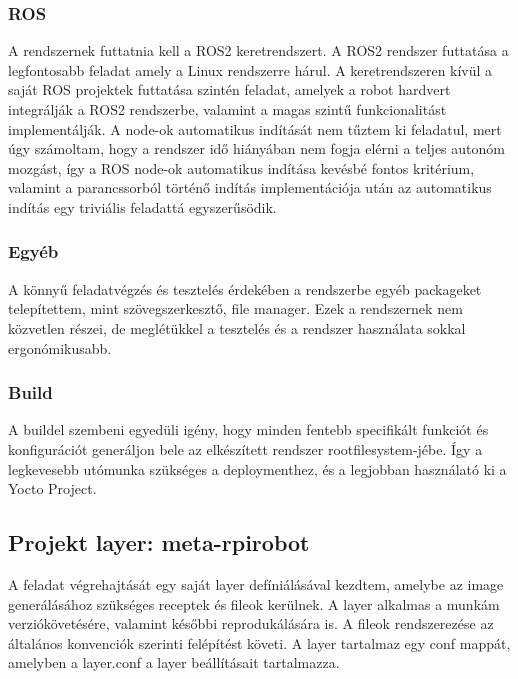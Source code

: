 \subsubsection{ROS}

A rendszernek futtatnia kell a ROS2 keretrendszert. A ROS2 rendszer
futtatása a legfontosabb feladat amely a Linux rendszerre hárul. A
keretrendszeren kívül a saját ROS projektek futtatása szintén feladat, amelyek a
robot hardvert integrálják a ROS2 rendszerbe, valamint a magas szintű
funkcionalitást implementálják. A node-ok automatikus indítását nem tűztem ki
feladatul, mert úgy számoltam, hogy a rendszer idő hiányában nem fogja elérni a
teljes autonóm mozgást, így a ROS node-ok automatikus indítása kevésbé fontos
kritérium, valamint a parancssorból történő indítás implementációja után az
automatikus indítás egy triviális feladattá egyszerűsödik.

\subsubsection{Egyéb}

A könnyű feladatvégzés és tesztelés érdekében a rendszerbe egyéb packageket
telepítettem, mint szövegszerkesztő, file manager. Ezek a rendszernek nem
közvetlen részei, de meglétükkel a tesztelés és a rendszer használata sokkal
ergonómikusabb. 

\subsubsection{Build}

A buildel szembeni egyedüli igény, hogy minden fentebb specifikált funkciót és
konfigurációt generáljon bele az elkészített rendszer rootfilesystem-jébe. Így a
legkevesebb utómunka szükséges a deploymenthez, és a legjobban használató ki a
Yocto Project.

\subsection{Projekt layer: meta-rpirobot}

A feladat végrehajtását egy saját layer defíniálásával kezdtem, amelybe az image
generálásához szükséges receptek és fileok kerülnek. A layer alkalmas a munkám
verziókövetésére, valamint későbbi reprodukálására is. A fileok rendszerezése az
általános konvenciók szerinti felépítést követi. A layer tartalmaz egy conf
mappát, amelyben a layer.conf a layer beállításait tartalmazza.

